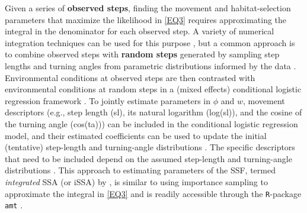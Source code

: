 \documentclass[../FinalThesis.tex]{subfiles}
\begin{document}
Given a series of \textbf{observed steps}, finding the movement and
habitat-selection parameters that maximize the likelihood in \ref{EQ3} requires
approximating the integral in the denominator for each observed step. A variety
of numerical integration techniques can be used for this purpose
\citep{Michelot.2024}, but a common approach is to combine observed steps with
\textbf{random steps} generated by sampling step lengths and turning angles from
parametric distributions informed by the data \citep{Fortin.2005,
Thurfjell.2014}. Environmental conditions at observed steps are then contrasted
with environmental conditions at random steps in a (mixed effects) conditional
logistic regression framework \citep{Fortin.2005, Muff.2020}. To jointly
estimate parameters in $\phi$ and $w$, movement descriptors (e.g., step length
(sl), its natural logarithm (log(sl)), and the cosine of the turning angle
(cos(ta))) can be included in the conditional logistic regression model, and
their estimated coefficients can be used to update the initial (tentative)
step-length and turning-angle distributions \citep{Duchesne.2015, Avgar.2016,
Fieberg.2021}. The specific descriptors that need to be included depend on the
assumed step-length and turning-angle distributions \citep[for more details, see
Appendix C of][]{Fieberg.2021}. This approach to estimating parameters of the
SSF, termed \textit{integrated} SSA (or iSSA) by \citet{Avgar.2016}, is similar
to using importance sampling to approximate the integral in \ref{EQ3}
\citep{Michelot.2024} and is readily accessible through the \texttt{R}-package
\texttt{amt} \citep{Signer.2019}.

\end{document}
